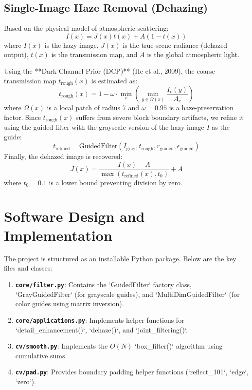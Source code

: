 \documentclass[11pt,a4paper]{article}
\begin{document}
\subsection{Single-Image Haze Removal (Dehazing)}
Based on the physical model of atmospheric scattering:
\begin{equation}
    I(x) = J(x)t(x) + A(1 - t(x))
\end{equation}
where $I(x)$ is the hazy image, $J(x)$ is the true scene radiance (dehazed output), $t(x)$ is the transmission map, and $A$ is the global atmospheric light.

Using the **Dark Channel Prior (DCP)** (He et al., 2009), the coarse transmission map $t_{\text{rough}}(x)$ is estimated as:
\begin{equation}
    t_{\text{rough}}(x) = 1 - \omega \cdot \min_c \left( \min_{y \in \Omega(x)} \frac{I_c(y)}{A_c} \right)
\end{equation}
where $\Omega(x)$ is a local patch of radius 7 and $\omega = 0.95$ is a haze-preservation factor. Since $t_{\text{rough}}(x)$ suffers from severe block boundary artifacts, we refine it using the guided filter with the grayscale version of the hazy image $I$ as the guide:
\begin{equation}
    t_{\text{refined}} = \text{GuidedFilter}(I_{\text{gray}}, t_{\text{rough}}, r_{\text{guided}}, \epsilon_{\text{guided}})
\end{equation}
Finally, the dehazed image is recovered:
\begin{equation}
    J(x) = \frac{I(x) - A}{\max(t_{\text{refined}}(x), t_0)} + A
\end{equation}
where $t_0 = 0.1$ is a lower bound preventing division by zero.

\section{Software Design and Implementation}
The project is structured as an installable Python package. Below are the key files and classes:

\begin{enumerate}
    \item \textbf{\texttt{core/filter.py}}: Contains the `GuidedFilter` factory class, `GrayGuidedFilter` (for grayscale guides), and `MultiDimGuidedFilter` (for color guides using matrix inversion).
    \item \textbf{\texttt{core/applications.py}}: Implements helper functions for `detail_enhancement()`, `dehaze()`, and `joint_filtering()`.
    \item \textbf{\texttt{cv/smooth.py}}: Implements the $O(N)$ `box_filter()` algorithm using cumulative sums.
    \item \textbf{\texttt{cv/pad.py}}: Provides boundary padding helper functions (`reflect\_101`, `edge`, `zero`).
\end{enumerate}
\end{document}
